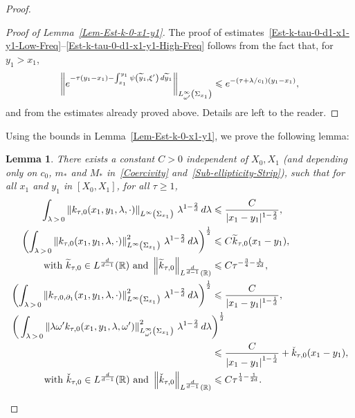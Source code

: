 \documentclass[10pt]{amsart}
\newtheorem{lemm}[theo]{Lemma}\newtheorem{prop}[theo]{Proposition}\newtheorem{coro}[theo]{Corollary}\newtheorem{conj}[theo]{Conjecture}
\theoremstyle{definition}\newtheorem{defi}[theo]{Definition}\newtheorem{rema}[theo]{Remark}\newtheorem{exam}[theo]{Example}\newtheorem{exem}[theo]{Example}\newtheorem{nota}[theo]{Notation}
\newcommand*\R{\mathbb{R}}
\newcommand{\norm}[1]{\left\Vert#1\right\Vert}
\renewcommand{\leq}{\leqslant}
\renewcommand{\geq}{\geqslant}
\renewcommand{\tilde}{\widetilde}
\let\oldtilde\tilde
\renewcommand*{\tilde}[1]{\mathchoice{\widetilde{#1}}{\widetilde{#1}}{\oldtilde{#1}}{\oldtilde{#1}}}
\begin{document}
\begin{proof}
\begin{proof}[Proof of Lemma~\ref{Lem-Est-k-0-x1-y1}]
The proof of estimates~\eqref{Est-k-tau-0-d1-x1-y1-Low-Freq}--\eqref{Est-k-tau-0-d1-x1-y1-High-Freq} follows from the fact that, for $y_1 > x_1$,
\[
\left\| e^{-\tau(y_1-x_1) - \int_{x_1}^{y_1} \psi\left(\tilde y_1, \xi'\right) \, d\tilde y_1}\right\|_{L^\infty_{\omega'}\left(\Sigma_{x_1}\right)}
\leq e^{-(\tau +\lambda/c_1) (y_1 - x_1)},
\]
and from the estimates already proved above. Details are left to the reader.
\end{proof}

Using the bounds in Lemma~\ref{Lem-Est-k-0-x1-y1}, we prove the following lemma:

\begin{lemm}\label{Lem-Est-k0-x1-y1-integratednorms}
There exists a constant $C >0$ independent of $X_0, X_1$ (and depending only on $c_0$, $m_*$ and $M_*$ in~\eqref{Coercivity} and~\eqref{Sub-ellipticity-Strip}), such that for all $x_1$ and $y_1$ in $[X_0, X_1]$, for all $\tau \geq 1$,
\begin{align}
\int_{\lambda\,>\,0} \norm{k_{\tau,0}(x_1, y_1, \lambda, \cdot) }_{L^\infty\left(\Sigma_{x_1}\right)} \, \lambda^{1 -\frac{2}{d}}\, d\lambda
&\leq
\frac{C}{|x_1 - y_1|^{1-\frac{2}{d}}},\label{est-k0-x1-y1-Lp-Lp'}
\\
\left(\int_{\lambda\,>\,0} \norm{k_{\tau,0}(x_1, y_1, \lambda, \cdot) }^2_{L^\infty\left(\Sigma_{x_1}\right)} \, \lambda^{1 -\frac{2}{d}}\, d\lambda\right)^{\frac{1}{2}}
&\leq C \tilde k_{\tau,0}(x_1-y_1),\label{est-k0-x1-y1-Lp-L2}
\\
\text{ with }\tilde k_{\tau,0} \in L^{\frac{d}{d-1}} (\R)\text{ and }
\left\|\tilde k_{\tau,0}\right\|_{L^{\frac{d}{d-1}} (\R)} &\leq C \tau^{-\frac{3}{4}-\frac{1}{2d}},
\notag
\\
\left(
\int_{\lambda\,>\,0} \norm{ k_{\tau,0, \partial_1 }(x_1, y_1, \lambda, \cdot) }^2_{L^\infty\left(\Sigma_{x_1}\right)} \, \lambda^{1 -\frac{2}{d}}\, d\lambda
\right)^{\frac{1}{2}}
&\leq
\frac{C}{|x_1 - y_1|^{1-\frac{1}{d}} },\label{est-k0-d1-x1-y1-Lp-L2}
\\
\bigg(\int_{\lambda\,>\,0} \norm{\lambda \omega' k_{\tau,0}(x_1, y_1, \lambda, \omega') }^2_{L^\infty_{\omega'}\left(\Sigma_{x_1}\right)} \, \lambda^{1 -\frac{2}{d}}\, d\lambda&\bigg)^{\frac{1}{2}}\label{est-k0-x1-y1-Lp-nabla'-L2}\\
&\leq
\frac{C}{\left|x_1 - y_1\right|^{1-\frac{1}{d}}} + \check k_{\tau,0}(x_1 -y_1),\nonumber
\\
\text{ with }\check k_{\tau,0} \in L^{\frac{d}{d-1}} (\R)\text{ and }
\left\|\check k_{\tau,0}\right\|_{L^{\frac{d}{d-1}} (\R)} &\leq C \tau^{\frac{1}{4}-\frac{1}{2d}}.
\notag
\end{align}
\end{lemm}


\end{proof}
\end{document}
